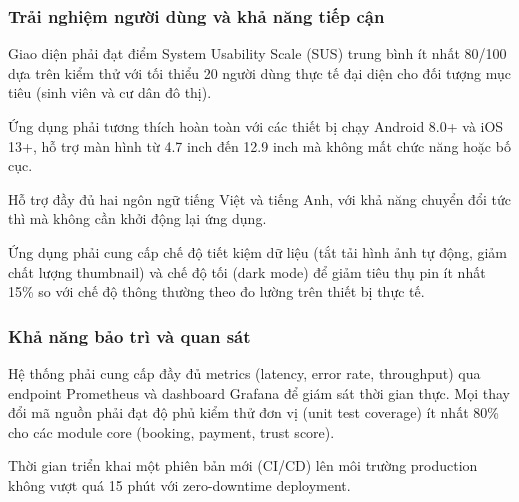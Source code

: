 \subsubsection*{Trải nghiệm người dùng và khả năng tiếp cận}
Giao diện phải đạt điểm System Usability Scale (SUS) trung bình ít nhất 80/100 dựa trên kiểm thử với tối thiểu 20 người dùng thực tế đại diện cho đối tượng mục tiêu (sinh viên và cư dân đô thị).

Ứng dụng phải tương thích hoàn toàn với các thiết bị chạy Android 8.0+ và iOS 13+, hỗ trợ màn hình từ 4.7 inch đến 12.9 inch mà không mất chức năng hoặc bố cục.

Hỗ trợ đầy đủ hai ngôn ngữ tiếng Việt và tiếng Anh, với khả năng chuyển đổi tức thì mà không cần khởi động lại ứng dụng.

Ứng dụng phải cung cấp chế độ tiết kiệm dữ liệu (tắt tải hình ảnh tự động, giảm chất lượng thumbnail) và chế độ tối (dark mode) để giảm tiêu thụ pin ít nhất 15\% so với chế độ thông thường theo đo lường trên thiết bị thực tế.

\subsubsection*{Khả năng bảo trì và quan sát}
Hệ thống phải cung cấp đầy đủ metrics (latency, error rate, throughput) qua endpoint Prometheus và dashboard Grafana để giám sát thời gian thực.
Mọi thay đổi mã nguồn phải đạt độ phủ kiểm thử đơn vị (unit test coverage) ít nhất 80\% cho các module core (booking, payment, trust score).

Thời gian triển khai một phiên bản mới (CI/CD) lên môi trường production không vượt quá 15 phút với zero-downtime deployment.
